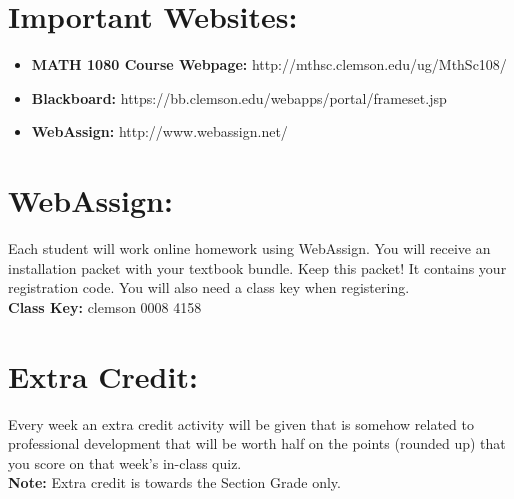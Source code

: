 \documentclass[paper=a4, fontsize=11pt]{scrartcl} %
\numberwithin{equation}{section} %
\numberwithin{figure}{section} %
\numberwithin{table}{section} %
\begin{document}

\section*{\textbf{Important Websites:}}

\begin{itemize}
\item \textbf{MATH 1080 Course Webpage:} http://mthsc.clemson.edu/ug/MthSc108/
\item \textbf{Blackboard:} https://bb.clemson.edu/webapps/portal/frameset.jsp
\item \textbf{WebAssign:} http://www.webassign.net/
\end{itemize}


\section*{\textbf{WebAssign:}}
Each student will work online homework using WebAssign. You will receive an  installation packet with your textbook bundle. Keep this packet! It contains your registration code. You will also need a class key when registering. \\

\textbf{Class Key:} clemson 0008 4158


\section*{\textbf{Extra Credit:}}
Every week an extra credit activity will be given that is somehow related to professional development that will be worth half on the points (rounded up) that you score on that week's in-class quiz. \\

\textbf{Note:} Extra credit is towards the Section Grade only.

\end{document}
